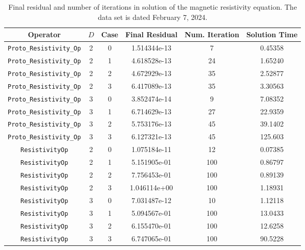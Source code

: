 \documentclass{article}
\begin{document}
\begin{small}
\begin{table}
\begin{center}
\begin{tabular}{|c|c|c|c|c||c|} \hline
 Operator                   & $D$ & Case & Final Residual &
 Num. Iteration & Solution Time\\
\hline
 \hline
 {\tt Proto\_Resistivity\_Op}     & 2   & 0    & 1.514344e-13   & 7  & 0.45358  \\
 {\tt Proto\_Resistivity\_Op}     & 2   & 1    & 4.618528e-13   & 24 & 1.65240  \\
 {\tt Proto\_Resistivity\_Op}     & 2   & 2    & 4.672929e-13   & 35 & 2.52877  \\
 {\tt Proto\_Resistivity\_Op}     & 2   & 3    & 6.417089e-13   & 35 & 3.30563  \\
 {\tt Proto\_Resistivity\_Op}     & 3   & 0    & 3.852474e-14   & 9  & 7.08352  \\
 {\tt Proto\_Resistivity\_Op}     & 3   & 1    & 6.714629e-13   & 27 & 22.9359  \\
 {\tt Proto\_Resistivity\_Op}     & 3   & 2    & 5.753176e-13   & 45 & 39.1402  \\
 {\tt Proto\_Resistivity\_Op}     & 3   & 3    & 6.127321e-13   & 45 & 125.603  \\
 \hline                                                    
 {\tt ResistivityOp}              & 2   & 0    & 1.075184e-11   & 12 & 0.07385  \\
 {\tt ResistivityOp}              & 2   & 1    & 5.151905e-01   & 100& 0.86797  \\
 {\tt ResistivityOp}              & 2   & 2    & 7.756453e-01   & 100& 0.89139  \\
 {\tt ResistivityOp}              & 2   & 3    & 1.046114e+00   & 100& 1.18931  \\
 {\tt ResistivityOp}              & 3   & 0    & 7.031487e-12   & 10 & 1.12118  \\
 {\tt ResistivityOp}              & 3   & 1    & 5.094567e-01   & 100& 13.0433  \\
 {\tt ResistivityOp}              & 3   & 2    & 6.155470e-01   & 100& 12.6258  \\
 {\tt ResistivityOp}              & 3   & 3    & 6.747065e-01   & 100& 90.5228  \\
\hline
\end{tabular}
\end{center}
\label{tab::resist2}
\caption
    {
      Final residual and number of iterations in solution of the
      magnetic resistivity equation.
      The data set is dated February 7, 2024.
    }
\end{table}
\end{small}
\end{document}
